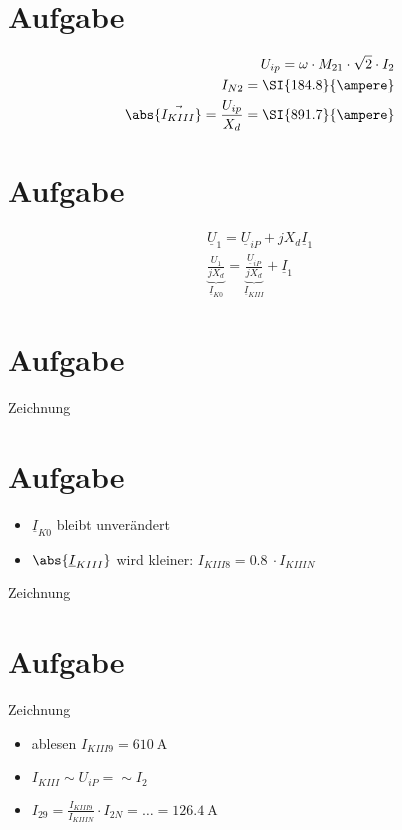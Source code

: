 \documentclass[10pt,a4paper]{article}
\begin{document}
\section{Aufgabe}
\begin{align*}
U_{ip} = \omega \cdot M_{21} \cdot \sqrt{2} \cdot I_2\\
I_{N2} = \SI{184.8}{\ampere}\\
\abs{\vec{I_{KIII}}} = \frac{U_{ip}}{X_d} = \SI{891.7}{\ampere}
\end{align*}

\section{Aufgabe}
\begin{align*}
\underline{U}_1 = \underline{U}_{iP} + jX_d\underline{I}_1\\
\underbrace{\frac{U_1}{jX_d}}_{\underline{I}_{K0}} = \underbrace{\frac{\underline{U}_{iP}}{jX_d}}_{\underline{I}_{KIII}} + \underline{I}_1
\end{align*}

\section{Aufgabe}
Zeichnung

\section{Aufgabe}
\begin{itemize}
\item $\underline{I}_{K0}$ bleibt unverändert
\item $\abs{\underline{I}_{KIII}}$ wird kleiner: $I_{KIII8} = \SI{0.8}{}\cdot I_{KIIIN}$
\end{itemize}
Zeichnung

\section{Aufgabe}
Zeichnung
\begin{itemize}
\item ablesen $I_{KIII9} = \SI{610}{\ampere}$
\item $I_{KIII} \sim U_{iP} = \sim I_2$
\item $I_{29} = \frac{I_{KIII9}}{I_{KIIIN}}\cdot I_{2N} = \ldots = \SI{126.4}{\ampere}$
\end{itemize}
\end{document}
